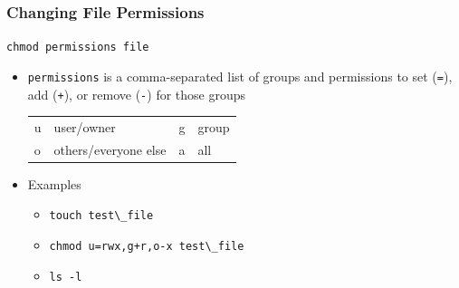 \documentclass[hyperref,pdfa,unicode,utf8,usepdftitle]{beamer}
\begin{document}
\begin{frame}
  \frametitle{Changing File Permissions}
  \lstinline{chmod permissions file}

  \begin{itemize}
  \item \lstinline{permissions} is a comma-separated list of groups
    and permissions to set (\lstinline{=}), add (\lstinline{+}), or
    remove (\lstinline{-}) for those groups
    \begin{tabular}{l>{\RaggedRight\arraybackslash\noindent}p{4cm}l>{\RaggedRight\arraybackslash\noindent}p{4cm}}
      u & user/owner           & g & group \\
      o & others/everyone else & a & all
    \end{tabular}

    \item Examples
    \begin{itemize}
    \item \lstinline{touch test\_file}
    \item \lstinline{chmod u=rwx,g+r,o-x test\_file}
    \item \lstinline{ls -l}
    \end{itemize}
    \end{itemize}
\end{frame}
\end{document}
